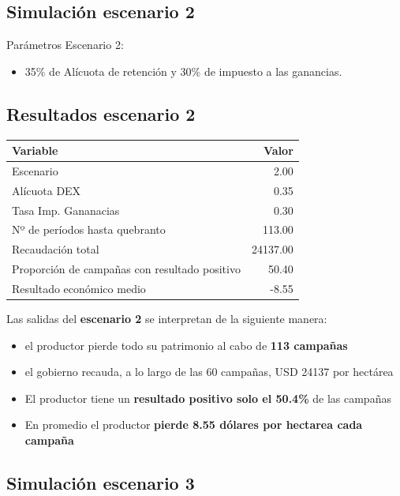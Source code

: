 \documentclass[
  12pt,
  spanish,
  10pt]{article}
\providecommand{\tightlist}{%
  \setlength{\itemsep}{0pt}\setlength{\parskip}{0pt}}
\begin{document}
\hypertarget{simulaciuxf3n-escenario-2}{%
\subsection{Simulación escenario 2}\label{simulaciuxf3n-escenario-2}}

Parámetros Escenario 2:

\begin{itemize}
\tightlist
\item
  35\% de Alícuota de retención y 30\% de impuesto a las ganancias.
\end{itemize}

\hypertarget{resultados-escenario-2}{%
\subsection{Resultados escenario 2}\label{resultados-escenario-2}}

\begin{longtable}[]{@{}lr@{}}
\toprule
Variable & Valor\tabularnewline
\midrule
\endhead
Escenario & 2.00\tabularnewline
Alícuota DEX & 0.35\tabularnewline
Tasa Imp. Gananacias & 0.30\tabularnewline
Nº de períodos hasta quebranto & 113.00\tabularnewline
Recaudación total & 24137.00\tabularnewline
Proporción de campañas con resultado positivo & 50.40\tabularnewline
Resultado económico medio & -8.55\tabularnewline
\bottomrule
\end{longtable}

Las salidas del \textbf{escenario 2} se interpretan de la siguiente
manera:

\begin{itemize}
\tightlist
\item
  el productor pierde todo su patrimonio al cabo de \textbf{113
  campañas}
\item
  el gobierno recauda, a lo largo de las 60 campañas, USD 24137 por
  hectárea
\item
  El productor tiene un \textbf{resultado positivo solo el 50.4\%} de
  las campañas
\item
  En promedio el productor \textbf{pierde 8.55 dólares por hectarea cada
  campaña}
\end{itemize}

\hypertarget{simulaciuxf3n-escenario-3}{%
\subsection{Simulación escenario 3}\label{simulaciuxf3n-escenario-3}}
\end{document}
